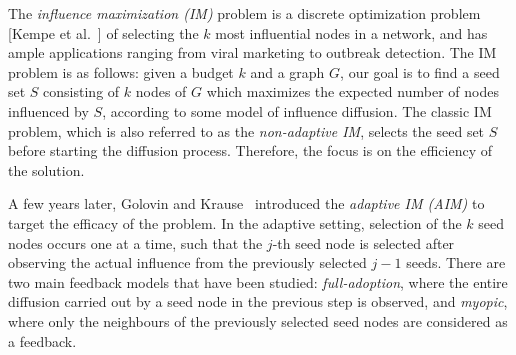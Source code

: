 \documentclass[11pt, a4paper, oneside]{Thesis} %
\begin{document}

%
%
%
%
%

\afterpage{\blankpage}


\abstract %

The \textit{influence maximization (IM)} problem is a discrete optimization problem [Kempe et al.~\cite{Kempe2003}] of selecting the $k$ most influential nodes in a network, and has ample applications ranging from viral marketing to outbreak detection. The IM problem is as follows: given a budget $k$ and a graph $G$, our goal is to find a seed set $S$ consisting of $k$ nodes of $G$ which maximizes the expected number of nodes influenced by $S$, according to some model of influence diffusion. The classic IM problem, which is also referred to as the \textit{non-adaptive IM}, selects the seed set $S$ before starting the diffusion process. Therefore, the focus is on the efficiency of the solution.

A few years later, Golovin and Krause~\cite{Golovin2011a} introduced the \textit{adaptive IM (AIM)} to target the efficacy of the problem. In the adaptive setting, selection of the $k$ seed nodes occurs one at a time, such that the $j$-th seed node is selected after observing the actual influence from the previously selected $j-1$ seeds. There are two main feedback models that have been studied: \textit{full-adoption}, where the entire diffusion carried out by a seed node in the previous step is observed, and \textit{myopic}, where only the neighbours of the previously selected seed nodes are considered as a feedback.
\end{document}
